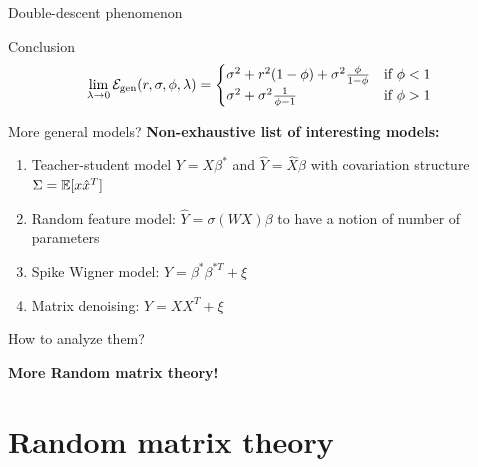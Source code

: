 \documentclass[10pt]{beamer}
\begin{document}
\begin{frame}{Double-descent phenomenon}
  \begin{alertblock}{Conclusion \cite{belkin2020two,Hastie-Montanari-2019}}
  \begin{equation*}
    \lim_{\lambda \to 0}\mathcal E_{\text{gen}}(r,\sigma,\phi,\lambda) = \begin{cases}
      \sigma^2 + r^2 (1-\phi) + \sigma^2 \frac{ \phi}{1 - \phi} & \text{if } \phi < 1   \\
      \sigma^2 + \sigma^2 \frac{1}{\phi - 1} & \text{if } \phi > 1
  \end{cases}
  \end{equation*}
  \end{alertblock}
\end{frame}




\begin{frame}{More general models?}
  \textbf{Non-exhaustive list of interesting models:}

  \begin{enumerate}
    \item Teacher-student model $Y = X \beta^*$ and $\hat Y = \hat X \beta$ with covariation structure $\Sigma = \mathbb E[ x \hat x^T]$
    \item Random feature model: $\hat Y = \sigma(WX) \beta$ to have a notion of number of parameters
    \item Spike Wigner model: $Y = \beta^{*} \beta^{*T} + \xi$ 
    \item Matrix denoising: $Y = XX^T + \xi$
  \end{enumerate}

  \vspace*{0.3cm}

  \begin{block}{How to analyze them?}
    \begin{center}
      \textbf{More Random matrix theory!}
    \end{center}
  \end{block}
\end{frame}

\section{Random matrix theory}
\end{document}
